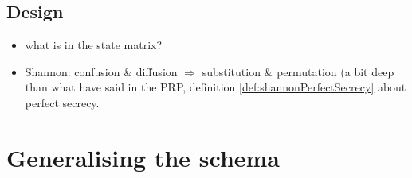 \documentclass[10pt,a4paper,twoside]{llncs}
\begin{document}

\subsection{Design}
\begin{itemize}
 \item what is in the state matrix?
 \item Shannon: confusion \& diffusion $\Rightarrow$ substitution \& permutation \cite{shannon-comTheorySecSys} (a bit deep than what have said in the PRP, definition \ref{def:shannonPerfectSecrecy} about perfect secrecy.
\end{itemize}

\section{Generalising the schema}
\end{document}
